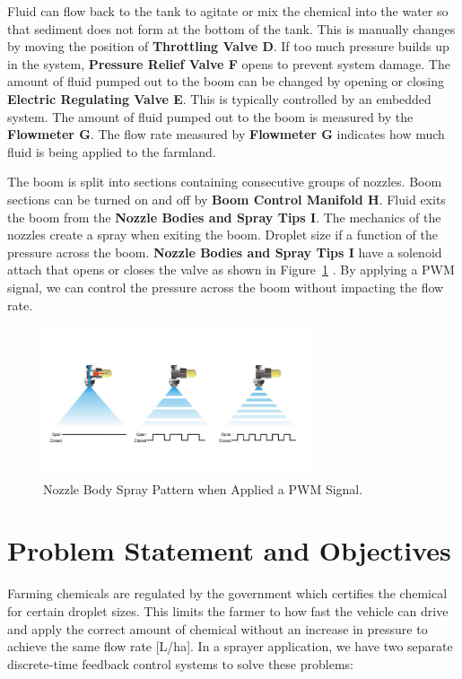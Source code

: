 Fluid can flow back to the tank to agitate or mix the chemical into the water so that sediment does not form at the bottom of the tank.  This is manually changes by moving the position of \textbf{Throttling Valve D}. If too much pressure builds up in the system, \textbf{Pressure Relief Valve F} opens to prevent system damage. The amount of fluid pumped out to the boom can be changed by opening or closing \textbf{Electric Regulating Valve E}. This is typically controlled by an embedded system. The amount of fluid pumped out to the boom is measured by the \textbf{Flowmeter G}.  The flow rate measured by \textbf{Flowmeter G} indicates how much fluid is being applied to the farmland. 

The boom is split into sections containing consecutive groups of nozzles. Boom sections can be turned on and off by\textbf{ Boom Control Manifold H}. Fluid exits the boom from the \textbf{Nozzle Bodies and Spray Tips I}. The mechanics of the nozzles create a spray when exiting the boom. Droplet size if a function of the pressure across the boom.  \textbf{Nozzle Bodies and Spray Tips I} have a solenoid attach that opens or closes the valve as shown in Figure~\ref{fig:SprayPattern} .  By applying a PWM signal, we can control the pressure across the boom without impacting the flow rate.
%
\begin{figure}
  \centering
  \includegraphics[width=0.7\textwidth]{figs/img/PWM-valve}
  \caption{Nozzle Body Spray Pattern when Applied a PWM Signal.}
  \label{fig:SprayPattern}
\end{figure}


\section{Problem Statement and Objectives}
\label{sec:probl-stat-object}

Farming chemicals are regulated by the government which certifies the chemical for certain droplet sizes. This limits the farmer to how fast the vehicle can drive and apply the correct amount of chemical without an increase in pressure to achieve the same flow rate [L/ha]. In a sprayer application, we have two separate discrete-time feedback control systems to solve these problems:

